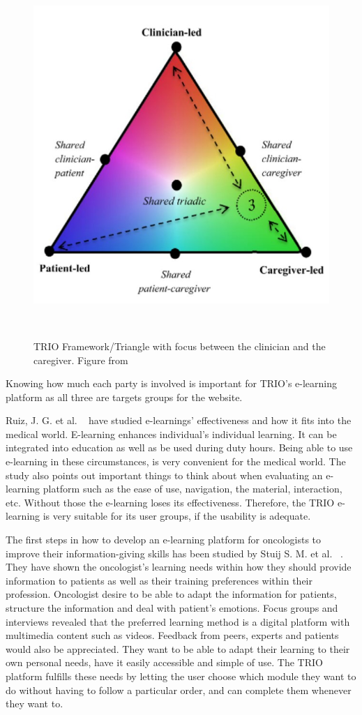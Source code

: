\documentclass{sigchi}
\begin{document}
\begin{figure}[H]
\centering
  \includegraphics[width=0.9\columnwidth]{figures/Triangle3Screenshot.jpg}
  \caption{TRIO Framework/Triangle with focus between the clinician and the caregiver. Figure from}~\label{fig:figure1}
\end{figure}

Knowing how much each party is involved is important for TRIO’s e-learning platform as all three are targets groups for the website. 

Ruiz, J. G. et al. ~\cite{Ruiz2006} have studied e-learnings’ effectiveness and how it fits into the medical world. E-learning enhances individual’s individual learning. It can be integrated into education as well as be used during duty hours. Being able to use e-learning in these circumstances, is very convenient for the medical world. The study also points out important things to think about when evaluating an e-learning platform such as the ease of use, navigation, the material, interaction, etc. Without those the e-learning loses its effectiveness. Therefore, the TRIO e-learning is very suitable for its user groups, if the usability is adequate. 

The first steps in how to develop an e-learning platform for oncologists to improve their information-giving skills has been studied by Stuij S. M. et al. ~\cite{Stuij2018}. They have shown the oncologist’s learning needs within how they should provide information to patients as well as their training preferences within their profession. Oncologist desire to be able to adapt the information for patients, structure the information and deal with patient’s emotions. Focus groups and interviews revealed that the preferred learning method is a digital platform with multimedia content such as videos. Feedback from peers, experts and patients would also be appreciated. They want to be able to adapt their learning to their own personal needs, have it easily accessible and simple of use. The TRIO platform fulfills these needs by letting the user choose which module they want to do without having to follow a particular order, and can complete them whenever they want to. 
\end{document}
